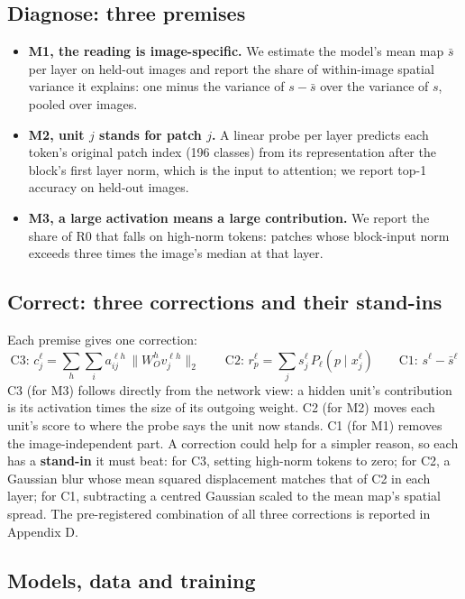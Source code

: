\documentclass{article}
\begin{document}
\subsection{Diagnose: three premises}

\begin{itemize}
\item \textbf{M1, the reading is image-specific.} We estimate the model's mean map $\bar s$ per layer on held-out images and report the share of within-image spatial variance it explains: one minus the variance of $s - \bar s$ over the variance of $s$, pooled over images.
\item \textbf{M2, unit $j$ stands for patch $j$.} A linear probe per layer predicts each token's original patch index (196 classes) from its representation after the block's first layer norm, which is the input to attention; we report top-1 accuracy on held-out images.
\item \textbf{M3, a large activation means a large contribution.} We report the share of R0 that falls on high-norm tokens: patches whose block-input norm exceeds three times the image's median at that layer.
\end{itemize}

\subsection{Correct: three corrections and their stand-ins}

Each premise gives one correction:
\begin{equation}
\text{C3: } c^{\ell}_j = \sum_{h}\sum_{i} a^{\ell h}_{ij}\,\lVert W_O^{h} v^{\ell h}_j \rVert_2 \qquad \text{C2: } r^{\ell}_p = \sum_j s^{\ell}_j \, P_\ell(p \mid x^{\ell}_j) \qquad \text{C1: } s^{\ell} - \bar{s}^{\ell}
\end{equation}
C3 (for M3) follows directly from the network view: a hidden unit's contribution is its activation times the size of its outgoing weight. C2 (for M2) moves each unit's score to where the probe says the unit now stands. C1 (for M1) removes the image-independent part. A correction could help for a simpler reason, so each has a \textbf{stand-in} it must beat: for C3, setting high-norm tokens to zero; for C2, a Gaussian blur whose mean squared displacement matches that of C2 in each layer; for C1, subtracting a centred Gaussian scaled to the mean map's spatial spread. The pre-registered combination of all three corrections is reported in Appendix D.

\subsection{Models, data and training}
\end{document}
